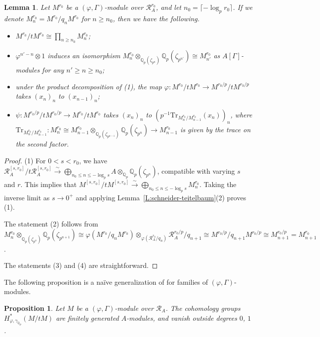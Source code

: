 \documentclass[12pt]{article}
\newtheorem{lemma}[theorem]{Lemma}
\newtheorem{prop}[theorem]{Proposition}
\theoremstyle{definition}
\numberwithin{equation}{theorem}
\newcommand{\calR}{\mathcal{R}}
\newcommand{\QQ}{\mathbb{Q}}
\def\Qp{\QQ_p}
\newcommand{\Tr}{\mathrm{Tr}}
\begin{document}
\begin{lemma}
\label{L:structure of M/tM}
Let $M^{r_0}$ be a $(\varphi,\Gamma)$-module over $\calR_A^{r_0}$, and
let $n_0 = \lceil -\log_p r_0 \rceil$.  If we denote $M_n^{r_0} =
M^{r_0} / q_nM^{r_0}$ for $n \geq n_0$, then we have the
following.
\begin{itemize}
\item[(1)] $M^{r_0} / tM^{r_0} \cong \prod_{n \geq n_0}M_n^{r_0}$;
\item[(2)] $\varphi^{n'-n} \otimes 1$ induces an isomorphism $M^{r_0}_n \otimes_{\Qp(\zeta_{p^n})} \Qp(\zeta_{p^{n'}}) \cong M^{r_0}_{n'}$ as $A[\Gamma]$-modules for any $n' \geq n \geq n_0$;
\item[(3)] under the product decomposition of (1), the map $\varphi: M^{r_0}/tM^{r_0} \to M^{r_0/p}/tM^{r_0/p}$ takes $(x_n)_n$ to $(x_{n-1})_n$;
\item[(4)] $\psi: M^{r_0/p}/tM^{r_0/p} \to M^{r_0}/tM^{r_0}$ takes $(x_n)_n$ to $(p^{-1}\Tr_{M_n^{r_0}/M_{n-1}^{r_0}}(x_n))_n$, where $\Tr_{M_n^{r_0}/M_{n-1}^{r_0}}: M_n^{r_0} \cong M_{n-1}^{r_0} \otimes_{\Qp(\zeta_{p^{n-1}})} \Qp(\zeta_{p^n}) \to M_{n-1}^{r_0}$ is given by the trace on the second factor.
\end{itemize}
\end{lemma}
\begin{proof}
(1) For $0<s< r_0$, we have $\calR_A^{[s,r_0]} / t\calR_A^{[s,r_0]} \stackrel \sim \rightarrow \bigoplus_{n_0 \leq n \leq -\log_ps} A \otimes_{\Qp} \Qp(\zeta_{p^n})$, compatible with varying $s$ and $r$.  This implies that $M^{[s,r_0]} / tM^{[s,r_0]} \stackrel \sim \rightarrow \bigoplus_{n_0 \leq n \leq -\log_ps} M_n^{r_0}$. Taking the inverse limit as $s \to 0^+$ and applying Lemma~\ref{L:schneider-teitelbaum}(2) proves (1).

The statement (2) follows from
$
M_n^{r_0}
  \otimes_{\Qp(\zeta_{p^n})} \Qp(\zeta_{p^{n+1}})
\cong
\varphi(M^{r_0}/q_nM^{r_0})
  \otimes_{\varphi(\calR_A^{r_0}/q_n)} \calR_A^{r_0/p}/q_{n+1}
\cong
M^{r_0/p}/q_{n+1}M^{r_0/p}
\cong
M_{n+1}^{r_0/p} = M_{n+1}^{r_0}$.

The statements (3) and (4) are straightforward.
\end{proof}

The following proposition is a na\"ive generalization of \cite[Theorem~3.7]{liu} for families of $(\varphi, \Gamma)$-modules.

\begin{prop}
\label{P:finite cohomology M/t}
Let $M$ be a $(\varphi, \Gamma)$-module over $\calR_A$.  The cohomology groups $H^*_{\varphi, \gamma_{\Qp}}(M/tM)$ are finitely generated $A$-modules, and vanish outside degrees $0$, $1$.
\end{prop}
\end{document}
